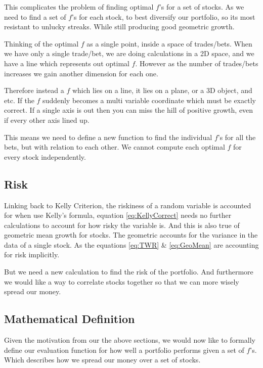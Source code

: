 \documentclass[12pt]{article}
\begin{document}
    This complicates the problem of finding optimal \(f\)'s for a set of stocks. As we
    need to find a set of \(f\)'s for each stock, to best diversify our portfolio, so
    its most resistant to unlucky streaks. While still producing good geometric growth.

    Thinking of the optimal \(f\) as a single point, inside a space of trades/bets. When we have 
    only a single trade/bet, we are doing calculations in a 2D space, and we have a line which 
    represents out optimal \(f\). However as the number of trades/bets increases we gain
    another dimension for each one.

    Therefore instead a \(f\) which lies on a line, it lies on a plane, or a 3D object, 
    and etc. If the \(f\) suddenly becomes a multi variable coordinate which must be 
    exactly correct. If a single axis is out then you can miss the hill of positive 
    growth, even if every other axis lined up.

    This means we need to define a new function to find the individual \(f\)'s for all the bets,
    but with relation to each other. We cannot compute each optimal \(f\) for every stock
    independently.


\subsection{Risk}

    Linking back to Kelly Criterion, the riskiness of a random variable is accounted for
    when use Kelly's formula, equation \ref{eq:KellyCorrect} needs no further calculations
    to account for how risky the variable is. And this is also true of geometric mean growth
    for stocks. The geometric accounts for the variance in the data of a single stock. As the
    equations \ref{eq:TWR} \& \ref{eq:GeoMean} are accounting for risk implicitly.

    But we need a new calculation to find the risk of the portfolio. And furthermore we would
    like a way to correlate stocks together so that we can more wisely spread our money.

\subsection{Mathematical Definition}

    Given the motivation from our the above sections, we would now like to formally define our
    evaluation function for how well a portfolio performs given a set of \(f\)'s. Which describes
    how we spread our money over a set of stocks.
\end{document}
